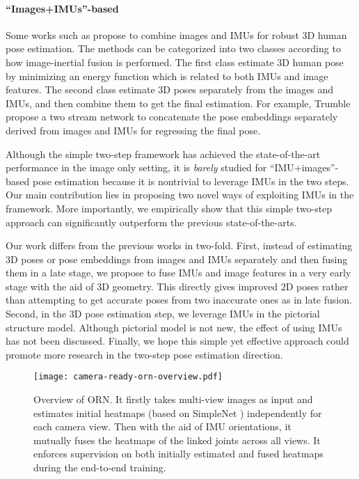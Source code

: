 \documentclass[10pt,twocolumn,letterpaper]{article}
\begin{document}
\paragraph{``Images+IMUs''-based}
Some works such as \cite{von2016human,trumble2017total,von2018recovering,gilbert2019fusing,malleson2017real} propose to combine images and IMUs for robust $3$D human pose estimation. The methods can be categorized into two classes according to how image-inertial fusion is performed. The first class \cite{malleson2017real,von2018recovering,von2016human} estimate $3$D human pose by minimizing an energy function which is related to both IMUs and image features. The second class \cite{trumble2017total,gilbert2019fusing} estimate $3$D poses separately from the images and IMUs, and then combine them to get the final estimation. For example, Trumble \etal \cite{trumble2017total,gilbert2019fusing} propose a two stream network to concatenate the pose embeddings separately derived from images and IMUs for regressing the final pose. 

Although the simple two-step framework has achieved the state-of-the-art performance in the image only setting, it is \emph{barely} studied for ``IMU+images''-based pose estimation because it is nontrivial to leverage IMUs in the two steps. Our main contribution lies in proposing two novel ways of exploiting IMUs in the framework. More importantly, we empirically show that this simple two-step approach can significantly outperform the previous state-of-the-arts. 

Our work differs from the previous works \cite{trumble2017total,von2018recovering,gilbert2019fusing,malleson2017real,loper2015smpl} in two-fold. First, instead of estimating $3$D poses or pose embeddings from images and IMUs separately and then fusing them in a late stage, we propose to fuse IMUs and image features in a very early stage with the aid of $3$D geometry. This directly gives improved $2$D poses rather than attempting to get accurate poses from two inaccurate ones as in late fusion. Second, in the $3$D pose estimation step, we leverage IMUs in the pictorial structure model. Although pictorial model is not new, the effect of using IMUs has not been discussed. Finally, we hope this simple yet effective approach could promote more research in the two-step pose estimation direction.

\begin{figure}
	\centering
	\texttt{[image: camera-ready-orn-overview.pdf]}
	\caption{Overview of ORN. It firstly takes multi-view images as input and estimates initial heatmaps (based on SimpleNet \cite{simplebaselines}) independently for each camera view. Then with the aid of IMU orientations, it mutually fuses the heatmaps of the linked joints across all views. It enforces supervision on both initially estimated and fused heatmaps during the end-to-end training.}
	\label{fig:pipeline}
\end{figure}
\end{document}
